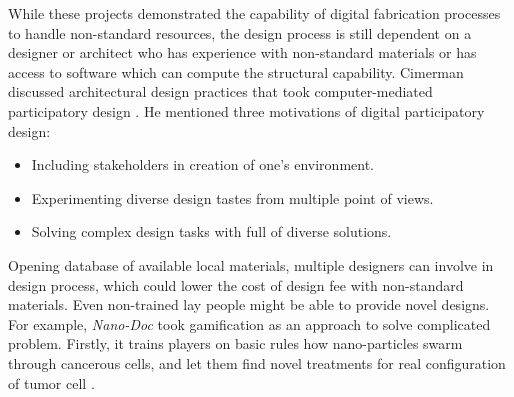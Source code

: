 While these projects demonstrated the capability of digital fabrication processes to handle non-standard resources, the design process is still dependent on a designer or architect who has experience with non-standard materials or has access to software which can compute the structural capability.
Cimerman discussed architectural design practices that took computer-mediated participatory design \cite{cimerman2000participatory}.
He mentioned three motivations of digital participatory design:
\begin{itemize}
 \item{Including stakeholders in creation of one's environment.}
 \item{Experimenting diverse design tastes from multiple point of views.}
 \item{Solving complex design tasks with full of diverse solutions.}
\end{itemize}
Opening database of available local materials, multiple designers can involve in design process, which could lower the cost of design fee with non-standard materials.
Even non-trained lay people might be able to provide novel designs.
For example, \textit{Nano-Doc} took gamification as an approach to solve complicated problem. Firstly, it trains players on basic rules how nano-particles swarm through cancerous cells, and let them find novel treatments for real configuration of tumor cell \cite{hauertcrowdsourcing}.
\\
